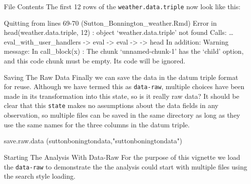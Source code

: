 \documentclass[
  ignorenonframetext,
]{beamer}
\newenvironment{Shaded}{\begin{snugshade}}{\end{snugshade}}
\newcommand{\AttributeTok}[1]{\textcolor[rgb]{0.77,0.63,0.00}{#1}}
\newcommand{\CommentTok}[1]{\textcolor[rgb]{0.56,0.35,0.01}{\textit{#1}}}
\newcommand{\ConstantTok}[1]{\textcolor[rgb]{0.00,0.00,0.00}{#1}}
\newcommand{\FunctionTok}[1]{\textcolor[rgb]{0.00,0.00,0.00}{#1}}
\newcommand{\NormalTok}[1]{#1}
\newcommand{\OtherTok}[1]{\textcolor[rgb]{0.56,0.35,0.01}{#1}}
\newcommand{\SpecialCharTok}[1]{\textcolor[rgb]{0.00,0.00,0.00}{#1}}
\newcommand{\StringTok}[1]{\textcolor[rgb]{0.31,0.60,0.02}{#1}}
\begin{document}
\begin{frame}[fragile]{File Contents}
\protect\hypertarget{file-contents}{}
The first 12 rows of the \texttt{weather.data.triple} now look like
this:

Quitting from lines 69-70 (Sutton\_Bonnington\_weather.Rmd) Error in
head(weather.data.triple, 12) : object `weather.data.triple' not found
Calls: \ldots{} eval\_with\_user\_handlers -\textgreater{} eval
-\textgreater{} eval -\textgreater{} -\textgreater{} head In addition:
Warning message: In call\_block(x) : The chunk `unnamed-chunk-1' has the
`child' option, and this code chunk must be empty. Its code will be
ignored.
\end{frame}

\begin{frame}[fragile]{Saving The Raw Data}
\protect\hypertarget{saving-the-raw-data}{}
Finally we can save the data in the datum triple format for reuse.
Although we have termed this as \texttt{data-raw}, multiple choices have
been made in its transformation into this state, so is it really raw
data? It should be clear that this \texttt{state} makes no assumptions
about the data fields in any observation, so multiple files can be saved
in the same directory as long as they use the same names for the three
columns in the datum triple.

\begin{Shaded}
\begin{Highlighting}[]
\FunctionTok{save.raw.data}\NormalTok{ (suttonboningtondata,}\StringTok{"suttonboningtondata"}\NormalTok{)}
\end{Highlighting}
\end{Shaded}
\end{frame}

\begin{frame}[fragile]{Starting The Analysis With Data-Raw}
\protect\hypertarget{starting-the-analysis-with-data-raw}{}
For the purpose of this vignette we load the \texttt{data-raw} to
demonstrate the the analysis could start with multiple files using the
search style loading.

\begin{Shaded}
\end{Shaded}
\end{frame}
\end{document}
